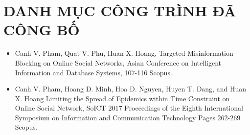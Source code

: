 \chapter*{DANH MỤC CÔNG TRÌNH ĐÃ CÔNG BỐ}


\begin{itemize}
	\item Canh V. Pham, Quat V. Phu, Huan X. Hoang, Targeted Misinformation Blocking on Online Social Networks, Asian Conference on Intelligent Information and Database Systems, 107-116 Scopus.
	
	\item Canh V. Pham, Hoang D. Minh, Hoa D. Nguyen, Huyen T. Dang, and Huan X. Hoang Limiting the Spread of Epidemics within Time Constraint on Online Social Network, SoICT 2017 Proceedings of the Eighth International Symposium on Information and Communication Technology Pages 262-269 Scopus.
	
\end{itemize}